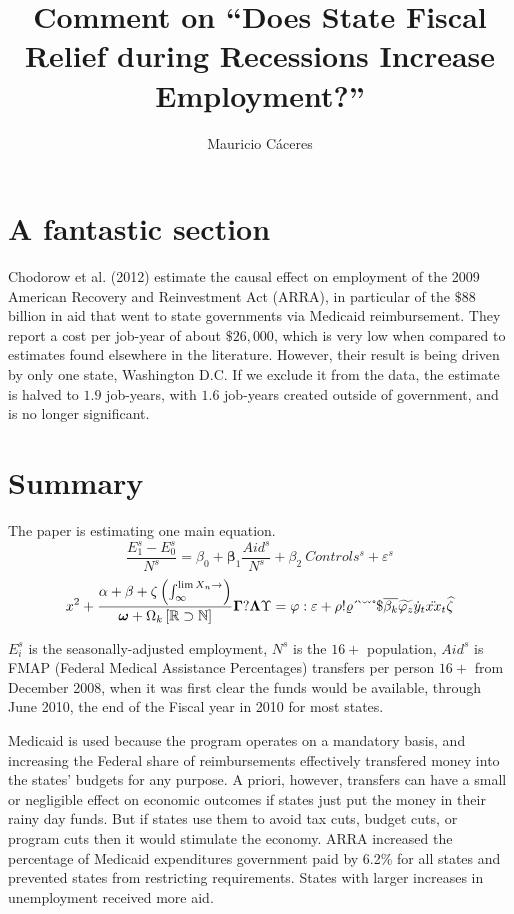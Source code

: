 \documentclass{article}
\title{Comment on ``Does State Fiscal Relief during Recessions Increase Employment?''}
\author{Mauricio C\'aceres}
\begin{document}
\displayoptions

\section{A fantastic section}
\label{sec:a_fantastic_section}

Chodorow et al. (2012) estimate the causal effect on employment of the 2009 American Recovery and Reinvestment Act (ARRA), in particular of the $\$88$ billion in aid that went to state governments via Medicaid reimbursement. They report a cost per job-year of about $\$26,000$, which is very low when compared to estimates found elsewhere in the literature. However, their result is being driven by only one state, Washington D.C. If we exclude it from the data, the estimate is halved to $1.9$ job-years, with $1.6$ job-years created outside of government, and is no longer significant.

\section{Summary}
\label{sec:summary}

The paper is estimating one main equation.
\begin{equation}
  \dfrac{E_1^s - E_0^s}{N^s}
  = \beta_0 + \bm\beta_1 \dfrac{Aid^s}{N^s} + \beta_2 ~ Controls^s + \varepsilon^s
\end{equation}
\[
  x^2 + \dfrac{\alpha + \beta + \zeta \left(\int_{\infty}^{\lim X_n \to \empty}\right)}{\bm \omega + \Omega_k \left[\mathbb{R} \supset \mathbb{N}\right]}
  \bm\Gamma ? \bm\Lambda\Upsilon = \varphi : \varepsilon + \rho ! \varrho
\acute ~ \grave ~ \breve ~ \check ~ \mathring ~ \mathdollar
\overline{\beta_k} \widetilde{\varphi_z} \dot{y}_t \ddot{xx}_t \widehat{\zeta}
\]


$E_i^s$ is the seasonally-adjusted employment, $N^s$ is the $16+$ population, $Aid^s$ is FMAP (Federal Medical Assistance Percentages) transfers per person $16+$ from December 2008, when it was first clear the funds would be available, through June 2010, the end of the Fiscal year in 2010 for most states.

Medicaid is used because the program operates on a mandatory basis, and increasing the Federal share of reimbursements effectively transfered money into the states' budgets for any purpose. A priori, however, transfers can have a small or negligible effect on economic outcomes if states just put the money in their rainy day funds. But if states use them to avoid tax cuts, budget cuts, or program cuts then it would stimulate the economy. ARRA increased the percentage of Medicaid expenditures government paid by 6.2\% for all states and prevented states from restricting requirements. States with larger increases in unemployment received more aid.
\end{document}
